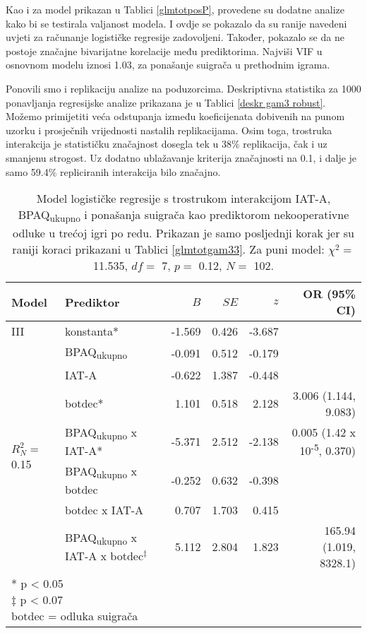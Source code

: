 \documentclass[a4paper, 12pt]{report}
\begin{document}
Kao i za model prikazan u Tablici \ref{glmtotposP}, provedene su dodatne analize
kako bi se testirala valjanost modela. I ovdje se pokazalo da su ranije navedeni
uvjeti za računanje logističke regresije zadovoljeni. Također, pokazalo se da ne
postoje značajne bivarijatne korelacije među prediktorima. Najviši VIF u
osnovnom modelu iznosi 1.03, za ponašanje suigrača u prethodnim igrama.

Ponovili smo i replikaciju analize na poduzorcima. Deskriptivna statistika za
1000 ponavljanja regresijske analize prikazana je u Tablici \ref{deskr gam3 robust}. 
Možemo primijetiti veća odstupanja
između koeficijenata dobivenih na punom uzorku i prosječnih vrijednosti nastalih
replikacijama. Osim toga, trostruka interakcija  je statističku
značajnost dosegla tek u 38\% replikacija, čak i uz smanjenu strogost. Uz
dodatno ublažavanje kriterija značajnosti na 0.1, i dalje je samo 59.4\%
repliciranih interakcija bilo značajno. 

\begin{table}
    \begin{center}
        \caption{\label{glmtotgam3} Model logističke regresije s trostrukom interakcijom IAT-A,
            BPAQ\textsubscript{ukupno} i ponašanja suigrača kao prediktorom
            nekooperativne odluke u trećoj igri po redu. Prikazan je samo posljednji korak
            jer su raniji koraci prikazani u Tablici \ref{glmtotgam33}. Za puni
            model: $\chi^2 =$
            11.535, $df =$ 7, $p =$ 0.12, $N =$ 102.}
        \hspace*{-0.5cm}\begin{tabular}{llrrrr}
        \toprule
        Model & Prediktor & $B$ & $SE$ & $z$ & OR (95\% CI)\\
        \midrule
        III & konstanta* & -1.569 & 0.426 & -3.687 &\\
        \multirow{7}{*}{$R^2_N =$ 0.15}
        &BPAQ\textsubscript{ukupno} & -0.091 & 0.512 & -0.179 & \\
        &IAT-A & -0.622 & 1.387 & -0.448 &\\
        &botdec* & 1.101 & 0.518 & 2.128 & 3.006 (1.144, 9.083)\\
        &BPAQ\textsubscript{ukupno} x IAT-A* & -5.371 & 2.512 & -2.138 & 0.005
        (1.42 x 10\textsuperscript{-5}, 0.370) \\
        &BPAQ\textsubscript{ukupno} x botdec & -0.252 & 0.632 & -0.398 &\\
        &botdec x IAT-A & 0.707 & 1.703 & 0.415 &\\
        & BPAQ\textsubscript{ukupno} x IAT-A x botdec$^\ddagger$ & 5.112 & 2.804
        & 1.823 & 165.94 (1.019, 8328.1) \\
        \bottomrule
        \multicolumn{5}{l}{
            \parbox{3cm}{\scriptsize \vspace{3pt} 
                * p < 0.05\\
                $\ddagger$  p < 0.07\\
                botdec = odluka suigrača
        }}
    \end{tabular}
\end{center}
\end{table}
\end{document}
